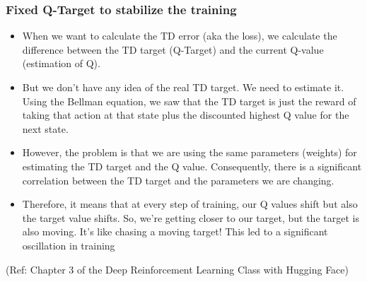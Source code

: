 \begin{frame}[fragile]\frametitle{Fixed Q-Target to stabilize the training}


\begin{itemize}
\item When we want to calculate the TD error (aka the loss), we calculate the difference between the TD target (Q-Target) and the current Q-value (estimation of Q).
\item But we don’t have any idea of the real TD target. We need to estimate it. Using the Bellman equation, we saw that the TD target is just the reward of taking that action at that state plus the discounted highest Q value for the next state.
\item However, the problem is that we are using the same parameters (weights) for estimating the TD target and the Q value. Consequently, there is a significant correlation between the TD target and the parameters we are changing.
\item Therefore, it means that at every step of training, our Q values shift but also the target value shifts. So, we’re getting closer to our target, but the target is also moving. It’s like chasing a moving target! This led to a significant oscillation in training
\end{itemize}


{\tiny (Ref: Chapter 3 of the Deep Reinforcement Learning Class with Hugging Face)}

\end{frame}



